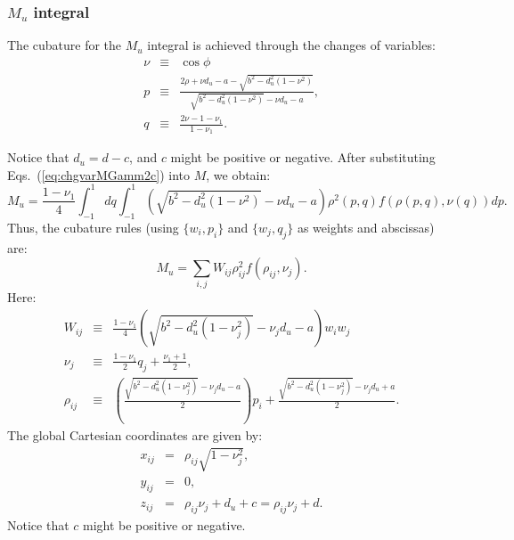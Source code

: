 \documentclass[11pt]{amsart}
\begin{document}
\subsubsection{$M_u$ integral}
The cubature for the $M_u$ integral is achieved through the changes of variables:
%
\begin{subequations}\label{eq:chgvarMGamm2c}
\begin{eqnarray}
	\nu & \equiv & \cos\phi\\
	p & \equiv & \frac{2\rho+\nu d_u-a-\sqrt{b^2-d_u^2(1-\nu^2)}}%
		{\sqrt{b^2-d_u^2(1-\nu^2)}-\nu d_u-a},\\
	q & \equiv & \frac{2\nu-1-\nu_1}{1-\nu_1}.
\end{eqnarray}
\end{subequations}
%

Notice that $d_u=d-c$, and $c$ might be positive or negative.
After substituting Eqs.~(\ref{eq:chgvarMGamm2c}) into $M$, we obtain:
%
\begin{equation}
	M_u=\frac{1-\nu_1}{4}\int_{-1}^1dq\int_{-1}^1\left(\sqrt{b^2-d_u^2(1-\nu^2)}-\nu d_u-a\right)
		\rho^2(p,q)f(\rho(p,q),\nu(q))dp.
\end{equation}
%
Thus, the cubature rules (using $\{w_i,p_i\}$ and $\{w_j,q_j\}$ as weights and abscissas) are:
%
\begin{equation}
	M_u=\sum_{i,j}W_{ij}
		\rho^2_{ij}f(\rho_{ij},\nu_j).
\end{equation}
%
Here:
%
\begin{subequations}\label{eq:nujrhoijMupDefs}
\begin{eqnarray}
	W_{ij} & \equiv & \frac{1-\nu_1}{4}%
	\left(\sqrt{b^2-d_u^2(1-\nu_j^2)}-\nu_jd_u-a\right)w_iw_j\\
	\nu_j & \equiv & \frac{1-\nu_1}{2}q_j+\frac{\nu_1+1}{2},\\
	\rho_{ij} & \equiv & \left(\frac{\sqrt{b^2-d_u^2(1-\nu_j^2)}-\nu_jd_u-a}{2}\right)p_i
	             + \frac{\sqrt{b^2-d_u^2(1-\nu_j^2)}-\nu_jd_u+a}{2}.
\end{eqnarray}
\end{subequations}
%
The global Cartesian coordinates are given by:
%
\begin{subequations}
\begin{eqnarray}
	x_{ij} & = & \rho_{ij}\sqrt{1-\nu_j^2},\\
	y_{ij}& = & 0,\\
	z_{ij} & = & \rho_{ij}\nu_j+d_u+c=\rho_{ij}\nu_j+d.
\end{eqnarray}
\end{subequations}
%
Notice that $c$ might be positive or negative.
\end{document}
